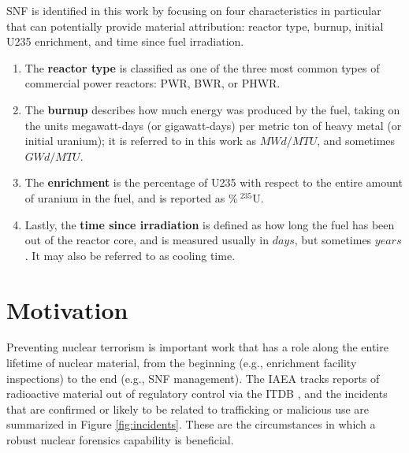 \gls{SNF} is identified in this work by focusing on four characteristics in
particular that can potentially provide material attribution: reactor type,
burnup, initial \gls{U235} enrichment, and time since fuel irradiation. 
\begin{enumerate}
  \item The \textbf{reactor type} is classified as one of the three most common
        types of commercial power reactors: \gls{PWR}, \gls{BWR}, or \gls{PHWR}.
  \item The \textbf{burnup} describes how much energy was produced by the fuel,
        taking on the units megawatt-days (or gigawatt-days) per metric 
        ton of heavy metal (or initial uranium); it is referred to in this work 
        as $MWd/MTU$, and sometimes $GWd/MTU$.  
  \item The \textbf{enrichment} is the percentage of \gls{U235} with respect to
        the entire amount of uranium in the fuel, and is reported as 
        $\%\:{}^{235}\text{U}$. 
  \item Lastly, the \textbf{time since irradiation} is defined as how long the
        fuel has been out of the reactor core, and is measured usually in $days$,
        but sometimes $years$. It may also be referred to as cooling time. 
\end{enumerate}

\section{Motivation}
\label{sec:motivation}

Preventing nuclear terrorism is important work that has a role along the entire
lifetime of nuclear material, from the beginning (e.g., enrichment facility
inspections) to the end (e.g., \gls{SNF} management). The \gls{IAEA} tracks
reports of radioactive material out of regulatory control via the \gls{ITDB}
\cite{itdb}, and the incidents that are confirmed or likely to be related to
trafficking or malicious use are summarized in Figure \ref{fig:incidents}.
These are the circumstances in which a robust nuclear forensics capability is
beneficial.

